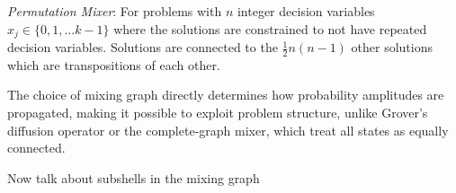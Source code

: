 \textit{Permutation Mixer}: For problems with $n$ integer decision variables $x_j\in\{0,1,...k-1\}$ where the solutions are constrained to not have repeated decision variables. Solutions are connected to the $\frac{1}{2}n(n-1)$ other solutions which are transpositions of each other.

The choice of mixing graph directly determines how probability amplitudes are propagated, making it possible to exploit problem structure, unlike Grover's diffusion operator or the complete-graph mixer, which treat all states as equally connected.

Now talk about subshells in the mixing graph
